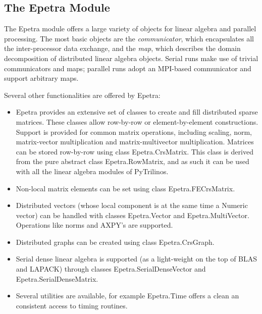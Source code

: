 \documentclass[10pt,relax]{SANDreport}
\begin{document}
\subsection{The Epetra Module}
\label{subsec:epetra}

The Epetra module offers a large variety of objects for linear algebra and
parallel processing. The most basic objects are the
{\sl communicator}, which
  encapsulates all the inter-processor data exchange, and the 
  {\sl map}, which describes the domain decomposition of
  distributed linear algebra objects. Serial runs make use of trivial
  communicators and maps; parallel runs adopt an MPI-based
  communicator and support arbitrary maps.

Several other functionalities are offered by Epetra:
\begin{itemize}
\item
Epetra provides an extensive set of classes to create and fill
distributed sparse matrices. These classes allow row-by-row or
element-by-element constructions. Support is provided for common
matrix operations, including scaling, norm, matrix-vector
multiplication and matrix-multivector multiplication.  
Matrices can be stored row-by-row using
class Epetra.CrsMatrix. This class is derived from the pure abstract class
Epetra.RowMatrix, and as such it can be used with all the linear algebra
modules of PyTrilinos.
\item Non-local matrix elements can be set using class Epetra.FECrsMatrix.
\item Distributed vectors (whose local component is at the same time a
                           Numeric vector) can be handled with classes
Epetra.Vector and Epetra.MultiVector. Operations like norms and AXPY's are
supported.
\item Distributed graphs can be created using class Epetra.CrsGraph.
\item Serial dense linear algebra is supported 
(as a light-weight on the top of BLAS and LAPACK) through classes
Epetra.SerialDenseVector and Epetra.SerialDenseMatrix.
\item Several utilities are available, for example Epetra.Time offers a clean
an consistent access to timing routines.
\end{itemize}

\end{document}
